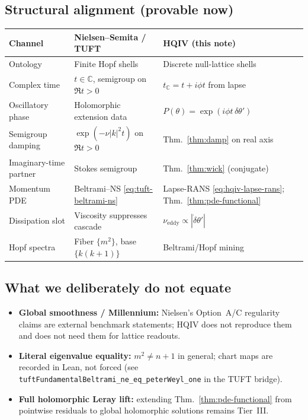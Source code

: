 \documentclass[11pt]{amsart}
\newcommand{\leanid}[1]{\nolinkurl{#1}}
\begin{document}
\subsection{Structural alignment (provable now)}

\begin{center}
\begin{tabular}{@{}lll@{}}
\toprule
\textbf{Channel} & \textbf{Nielsen--Semita / TUFT} & \textbf{HQIV (this note)} \\
\midrule
Ontology & Finite Hopf shells & Discrete null-lattice shells \\
Complex time & $t\in\mathbb C$, semigroup on $\Re t>0$ & $t_{\mathbb C}=t+i\phi t$ from lapse \\
Oscillatory phase & Holomorphic extension data & $P(\theta)=\exp(i\phi t\,\delta\theta')$ \\
Semigroup damping & $\exp(-\nu|k|^2 t)$ on $\Re t>0$ & Thm.~\ref{thm:damp} on real axis \\
Imaginary-time partner & Stokes semigroup & Thm.~\ref{thm:wick} (conjugate) \\
Momentum PDE & Beltrami--NS \eqref{eq:tuft-beltrami-ns} & Lapse-RANS \eqref{eq:hqiv-lapse-rans}; Thm.~\ref{thm:pde-functional} \\
Dissipation slot & Viscosity suppresses cascade & $\nu_{\mathrm{eddy}}\propto|\dot\delta\theta'|$ \\
Hopf spectra & Fiber $\{m^2\}$, base $\{k(k+1)\}$ & Beltrami/Hopf mining \cite{hqiv-tuft-bridge-paper} \\
\bottomrule
\end{tabular}
\end{center}

\subsection{What we deliberately do not equate}

\begin{itemize}[leftmargin=2em]
\item \textbf{Global smoothness / Millennium:} Nielsen's Option~A/C regularity claims are external
  benchmark statements; HQIV does not reproduce them and does not need them for lattice readouts.
\item \textbf{Literal eigenvalue equality:} $m^2\neq n+1$ in general; chart maps are recorded in Lean,
  not forced (see \leanid{tuftFundamentalBeltrami_ne_eq_peterWeyl_one} in the TUFT bridge).
\item \textbf{Full holomorphic Leray lift:} extending Thm.~\ref{thm:pde-functional} from pointwise
  residuals to global holomorphic solutions remains Tier~III.
\end{itemize}
\end{document}
